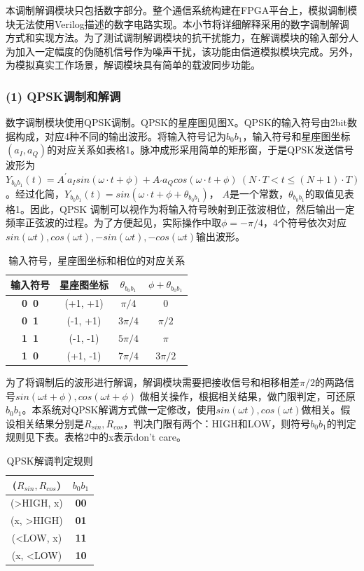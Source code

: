 本调制解调模块只包括数字部分。整个通信系统构建在FPGA平台上，模拟调制模块无法使用Verilog描述的数字电路实现。本小节将详细解释采用的数字调制解调方式和实现方法。为了测试调制解调模块的抗干扰能力，在解调模块的输入部分人为加入一定幅度的伪随机信号作为噪声干扰，该功能由信道模拟模块完成。另外，为模拟真实工作场景，解调模块具有简单的载波同步功能。
\subsubsection*{\normalfont (1) QPSK调制和解调}
数字调制模块使用QPSK调制。QPSK的星座图见图X。QPSK的输入符号由2bit数据构成，对应4种不同的输出波形。将输入符号记为$b_0b_1$，输入符号和星座图坐标$(a_{I}, a_{Q})$的对应关系如表格1。脉冲成形采用简单的矩形窗，于是QPSK发送信号波形为$Y_{b_0b_1}(t)=A^{\prime} a_{I} sin(\omega\cdot t + \phi) + A_{\prime} a_{Q} cos(\omega\cdot t + \phi)\ (N\cdot T < t \le (N+1)\cdot T)$ 。经过化简，$Y_{b_0b_1}(t)=sin(\omega\cdot t + \phi + \theta_{b_0b_1})$， $A$是一个常数，$\theta_{b_0b_1}$的取值见表格1。因此，QPSK 调制可以视作为将输入符号映射到正弦波相位，然后输出一定频率正弦波的过程。为了方便起见，实际操作中取$\phi=-\pi/4$，4个符号依次对应$sin(\omega t), cos(\omega t), -sin(\omega t), -cos(\omega t)$输出波形。\par

\begin{table}[!h]
\label{tab:QPSK}
\centering
\begin{tabular}{|c|c|c|c|}
\hline
输入符号 & 星座图坐标 & $\theta_{b_0b_1}$ & $\phi + \theta_{b_0b_1}$\\
\hline
\textbf{0\ 0} & (+1, +1) & $\pi/4$ & $0$\\
\hline
\textbf{0\ 1} & (-1, +1) & $3\pi/4$ & $\pi/2$\\
\hline
\textbf{1\ 1} & (-1, -1) & $5\pi/4$ & $\pi$\\
\hline
\textbf{1\ 0} & (+1, -1) & $7\pi/4$ & $3\pi/2$\\
\hline
\end{tabular}
\caption{输入符号，星座图坐标和相位的对应关系}
\end{table}

为了将调制后的波形进行解调，解调模块需要把接收信号和相移相差$\pi/2$的两路信号$sin(\omega t + \phi), cos(\omega t + \phi)$ 做相关操作，根据相关结果，做门限判定，可还原$b_0b_1$。本系统对QPSK解调方式做一定修改，使用$sin(\omega t), cos(\omega t)$做相关。假设相关结果分别是$R_{sin},R_{cos}$，判决门限有两个：HIGH和LOW，则符号$b_0b_1$的判定规则见下表。表格2中的x表示don't care。

\begin{table}[!h]

\label{tab:iQPSK}
\centering
\begin{tabular}{|c|c|}
\hline
($R_{sin}, R_{cos}$) & $b_0b_1$\\
\hline
(>HIGH, x) & \textbf{00}\\
\hline
(x, >HIGH) & \textbf{01}\\
\hline
(<LOW, x) & \textbf{11}\\
\hline
(x, <LOW) & \textbf{10}\\
\hline
\end{tabular}
\caption{QPSK解调判定规则}
\end{table}

